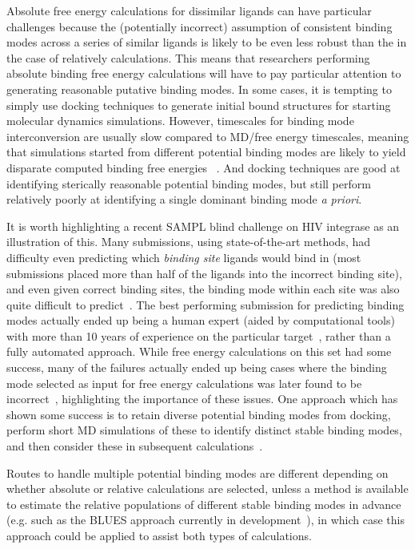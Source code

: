 \documentclass[9pt,bestpractices]{livecoms}
\begin{document}
Absolute free energy calculations for dissimilar ligands can have particular challenges because the (potentially incorrect) assumption of consistent binding modes across a series of similar ligands is likely to be even less robust than the in the case of relatively calculations.
This means that researchers performing absolute binding free energy calculations will have to pay particular attention to generating reasonable putative binding modes.
%
In some cases, it is tempting to simply use docking techniques to generate initial bound structures for starting molecular dynamics simulations.
However, timescales for binding mode interconversion are usually slow compared to MD/free energy timescales, meaning that simulations started from different potential binding modes are likely to yield disparate computed binding free energies~\cite{mobley2006use, palma2012computation, mobley2012perspective, gill2018binding} .
And docking techniques are good at identifying sterically reasonable potential binding modes, but still perform relatively poorly at identifying a single dominant binding mode \emph{a priori}.~\cite{} 
%

It is worth highlighting a recent SAMPL blind challenge on HIV integrase as an illustration of this. 
Many submissions, using state-of-the-art methods, had difficulty even predicting which \emph{binding site} ligands would bind in (most submissions placed more than half of the ligands into the incorrect binding site), and even given correct binding sites, the binding mode within each site was also quite difficult to predict~\cite{mobley2014blind}.
The best performing submission for predicting binding modes actually ended up being a human expert (aided by computational tools) with more than 10 years of experience on the particular target~\cite{voet2014combining}, rather than a fully automated approach.
While free energy calculations on this set had some success, many of the failures actually ended up being cases where the binding mode selected as input for free energy calculations was later found to be incorrect~\cite{gallicchio2014virtual}, highlighting the importance of these issues.
%
One approach which has shown some success is to retain diverse potential binding modes from docking, perform short MD simulations of these to identify distinct stable binding modes, and then consider these in subsequent calculations~\cite{gallicchio2014virtual, mobley2006use,rocklin2013blind, boyce2009predicting, mobley2007predicting}.
%

Routes to handle multiple potential binding modes are different depending on whether absolute or relative calculations are selected, unless a method is available to estimate the relative populations of different stable binding modes in advance (e.g. such as the BLUES approach currently in development~\cite{gill2018binding}), in which case this approach could be applied to assist both types of calculations.
%
\end{document}
